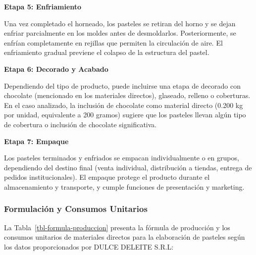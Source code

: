 \documentclass[
  stu,
  floatsintext,
  longtable,
  a4paper,
  nolmodern,
  notxfonts,
  notimes,
  12pt,
  colorlinks=true,linkcolor=blue,citecolor=blue,urlcolor=blue]{apa7}
\begin{document}
\textbf{Etapa 5: Enfriamiento}

Una vez completado el horneado, los pasteles se retiran del horno y se
dejan enfriar parcialmente en los moldes antes de desmoldarlos.
Posteriormente, se enfrían completamente en rejillas que permiten la
circulación de aire. El enfriamiento gradual previene el colapso de la
estructura del pastel.

\textbf{Etapa 6: Decorado y Acabado}

Dependiendo del tipo de producto, puede incluirse una etapa de decorado
con chocolate (mencionado en los materiales directos), glaseado, relleno
o coberturas. En el caso analizado, la inclusión de chocolate como
material directo (0.200 kg por unidad, equivalente a 200 gramos) sugiere
que los pasteles llevan algún tipo de cobertura o inclusión de chocolate
significativa.

\textbf{Etapa 7: Empaque}

Los pasteles terminados y enfriados se empacan individualmente o en
grupos, dependiendo del destino final (venta individual, distribución a
tiendas, entrega de pedidos institucionales). El empaque protege el
producto durante el almacenamiento y transporte, y cumple funciones de
presentación y marketing.

\subsubsection{Formulación y Consumos
Unitarios}\label{formulaciuxf3n-y-consumos-unitarios}

La Tabla~\ref{tbl-formula-produccion} presenta la fórmula de producción
y los consumos unitarios de materiales directos para la elaboración de
pasteles según los datos proporcionados por DULCE DELEITE S.R.L:
\end{document}
